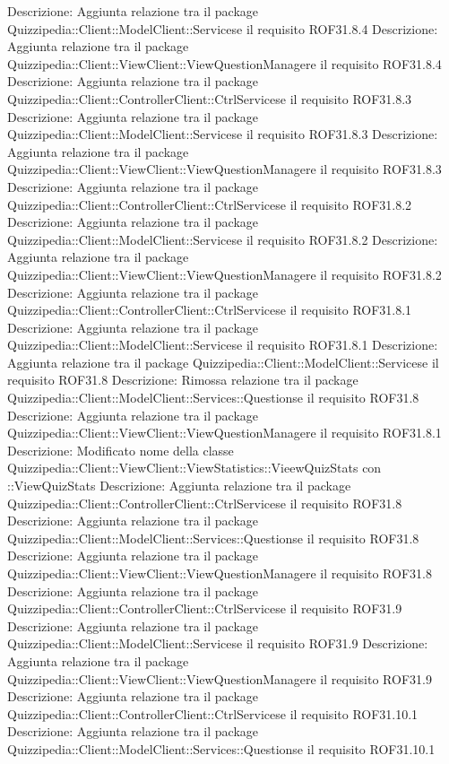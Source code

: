 Descrizione: Aggiunta relazione tra il package Quizzipedia::Client::ModelClient::Servicese il requisito ROF31.8.4 
Descrizione: Aggiunta relazione tra il package Quizzipedia::Client::ViewClient::ViewQuestionManagere il requisito ROF31.8.4 
Descrizione: Aggiunta relazione tra il package Quizzipedia::Client::ControllerClient::CtrlServicese il requisito ROF31.8.3 
Descrizione: Aggiunta relazione tra il package Quizzipedia::Client::ModelClient::Servicese il requisito ROF31.8.3 
Descrizione: Aggiunta relazione tra il package Quizzipedia::Client::ViewClient::ViewQuestionManagere il requisito ROF31.8.3 
Descrizione: Aggiunta relazione tra il package Quizzipedia::Client::ControllerClient::CtrlServicese il requisito ROF31.8.2 
Descrizione: Aggiunta relazione tra il package Quizzipedia::Client::ModelClient::Servicese il requisito ROF31.8.2 
Descrizione: Aggiunta relazione tra il package Quizzipedia::Client::ViewClient::ViewQuestionManagere il requisito ROF31.8.2 
Descrizione: Aggiunta relazione tra il package Quizzipedia::Client::ControllerClient::CtrlServicese il requisito ROF31.8.1 
Descrizione: Aggiunta relazione tra il package Quizzipedia::Client::ModelClient::Servicese il requisito ROF31.8.1 
Descrizione: Aggiunta relazione tra il package Quizzipedia::Client::ModelClient::Servicese il requisito ROF31.8 
Descrizione: Rimossa relazione tra il package Quizzipedia::Client::ModelClient::Services::Questionse il requisito ROF31.8 
Descrizione: Aggiunta relazione tra il package Quizzipedia::Client::ViewClient::ViewQuestionManagere il requisito ROF31.8.1 
Descrizione: Modificato nome della classe Quizzipedia::Client::ViewClient::ViewStatistics::VieewQuizStats con ::ViewQuizStats 
Descrizione: Aggiunta relazione tra il package Quizzipedia::Client::ControllerClient::CtrlServicese il requisito ROF31.8 
Descrizione: Aggiunta relazione tra il package Quizzipedia::Client::ModelClient::Services::Questionse il requisito ROF31.8 
Descrizione: Aggiunta relazione tra il package Quizzipedia::Client::ViewClient::ViewQuestionManagere il requisito ROF31.8 
Descrizione: Aggiunta relazione tra il package Quizzipedia::Client::ControllerClient::CtrlServicese il requisito ROF31.9 
Descrizione: Aggiunta relazione tra il package Quizzipedia::Client::ModelClient::Servicese il requisito ROF31.9 
Descrizione: Aggiunta relazione tra il package Quizzipedia::Client::ViewClient::ViewQuestionManagere il requisito ROF31.9 
Descrizione: Aggiunta relazione tra il package Quizzipedia::Client::ControllerClient::CtrlServicese il requisito ROF31.10.1 
Descrizione: Aggiunta relazione tra il package Quizzipedia::Client::ModelClient::Services::Questionse il requisito ROF31.10.1 
